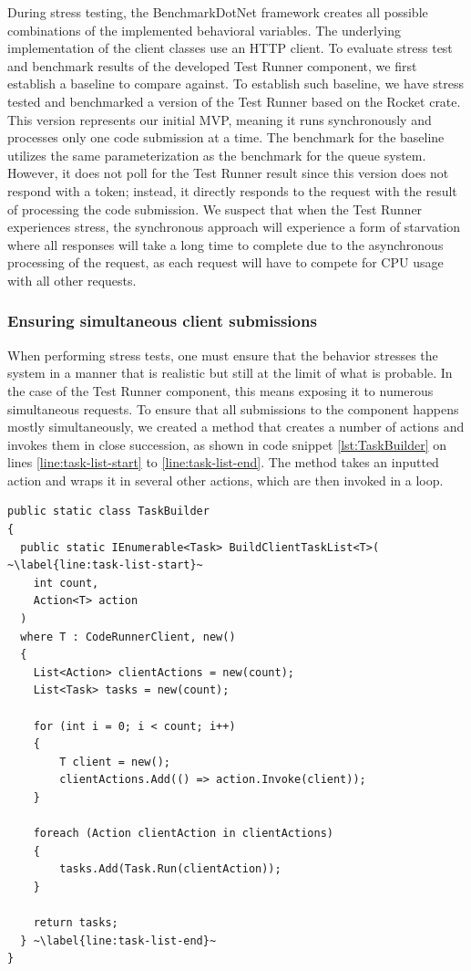 During stress testing, the BenchmarkDotNet framework creates all possible combinations of the implemented behavioral variables.
The underlying implementation of the client classes use an HTTP client.
To evaluate stress test and benchmark results of the developed Test Runner component, we first establish a baseline to compare against.
To establish such baseline, we have stress tested and benchmarked a version of the Test Runner based on the Rocket crate.
This version represents our initial MVP, meaning it runs synchronously and processes only one code submission at a time.
The benchmark for the baseline utilizes the same parameterization as the benchmark for the queue system.
However, it does not poll for the Test Runner result since this version does not respond with a token; instead, it directly responds to the request with the result of processing the code submission.
We suspect that when the Test Runner experiences stress, the synchronous approach will experience a form of starvation where all responses will take a long time to complete due to the asynchronous processing of the request, as each request will have to compete for CPU usage with all other requests.

\subsubsection{Ensuring simultaneous client submissions}
When performing stress tests, one must ensure that the behavior stresses the system in a manner that is realistic but still at the limit of what is probable.
In the case of the Test Runner component, this means exposing it to numerous simultaneous requests.
To ensure that all submissions to the component happens mostly simultaneously, we created a method that creates a number of actions and invokes them in close succession, as shown in code snippet \ref{lst:TaskBuilder} on lines \ref{line:task-list-start} to \ref{line:task-list-end}.
The method takes an inputted action and wraps it in several other actions, which are then invoked in a loop.

\begin{lstlisting}[language=CSharp, escapechar=~, caption={C\# code showing the \texttt{BuildClientTaskList} method, which is used to build a number of actions which are executed simultaneously in a Task}, label={lst:TaskBuilder}]
public static class TaskBuilder
{
  public static IEnumerable<Task> BuildClientTaskList<T>( ~\label{line:task-list-start}~
    int count,
    Action<T> action
  )
  where T : CodeRunnerClient, new()
  {
    List<Action> clientActions = new(count);
    List<Task> tasks = new(count);

    for (int i = 0; i < count; i++)
    {
        T client = new();
        clientActions.Add(() => action.Invoke(client));
    }

    foreach (Action clientAction in clientActions)
    {
        tasks.Add(Task.Run(clientAction));
    }

    return tasks;
  } ~\label{line:task-list-end}~
}
\end{lstlisting}


